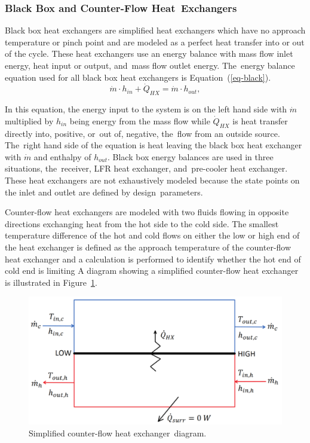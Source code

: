 \documentclass[sustainability,article,accept,moreauthors,pdftex]{Definitions/mdpi}
\begin{document}
\subsubsection{Black Box and Counter-Flow Heat~Exchangers}
Black box heat exchangers are simplified heat exchangers which have no approach temperature or pinch point and are modeled as a perfect heat transfer into or out of the cycle. These heat exchangers use an energy balance with mass flow inlet energy, heat input or output, and~mass flow outlet energy. The~energy balance equation used for all black box heat exchangers is Equation~(\ref{eq-black}).
\begin{equation}
    \label{eq-black}
    \dot{m} \cdot h_{in} + \dot{Q}_{HX} = \dot{m} \cdot h_{out} ,
\end{equation}

In this equation, the energy input to the system is on the left hand side with $\dot{m}$ multiplied by $h_{in}$ being energy from the mass flow while $\dot{Q}_{HX}$ is heat transfer directly into, positive, or~out of, negative, the~flow from an outside source. The~right hand side of the equation is heat leaving the black box heat exchanger with $\dot{m}$ and enthalpy of $h_{out}$. Black box energy balances are used in three situations, the~receiver, LFR heat exchanger, and~pre-cooler heat exchanger. These heat exchangers are not exhaustively modeled because the state points on the inlet and outlet are defined by design~parameters.

Counter-flow heat exchangers are modeled with two fluids flowing in opposite directions exchanging heat from the hot side to the cold side. %
{The smallest temperature difference of the hot and cold flows on either the low or high end of the heat exchanger is defined as the approach temperature of the counter-flow heat exchanger and a calculation is performed to identify whether the hot end of cold end is limiting}
A diagram showing a simplified counter-flow heat exchanger is illustrated in Figure~\ref{counter-flow-hx}.

\begin{figure}[H]
    \includegraphics[width=10 cm]{Definitions/counter-flow-hx.pdf}
    \caption{Simplified counter-flow heat exchanger~diagram. \label{counter-flow-hx}}
\end{figure}
\end{document}
